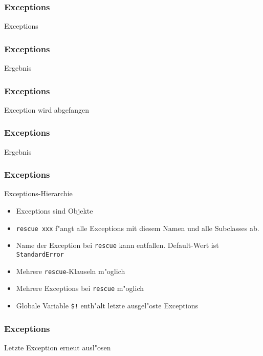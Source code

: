 \documentclass{beamer}
\begin{document}
\lstset{language=Ruby}
\lstset{basicstyle=\small,numbers=none, numberstyle=\tiny, numbersep=5pt}
\begin{frame}
  \frametitle{Exceptions}
  Exceptions
  
\end{frame}

\begin{frame}
  \frametitle{Exceptions}
  Ergebnis
  
\end{frame}

\begin{frame}
  \frametitle{Exceptions}
  Exception wird abgefangen
  
\end{frame}

\begin{frame}
  \frametitle{Exceptions}
  Ergebnis
  
\end{frame}

\begin{frame}
  \frametitle{Exceptions}
  Exceptions-Hierarchie
  
\end{frame}


\begin{frame}
  \begin{itemize}
    \item Exceptions sind Objekte
    \pause
    \item \texttt{rescue xxx} f"angt alle Exceptions mit diesem Namen und alle Subclasses ab.
    \pause
    \item Name der Exception bei \texttt{rescue} kann entfallen. Default-Wert ist \texttt{StandardError}
    \pause
    \item Mehrere \texttt{rescue}-Klauseln m"oglich
    \pause
    \item Mehrere Exceptions bei \texttt{rescue} m"oglich
    \pause
    \item Globale Variable \texttt{\$!} enth"alt letzte ausgel"oste Exceptions
  \end{itemize}
\end{frame}

\begin{frame}
  \frametitle{Exceptions}
  Letzte Exception erneut ausl"osen
  
\end{frame}
\end{document}
